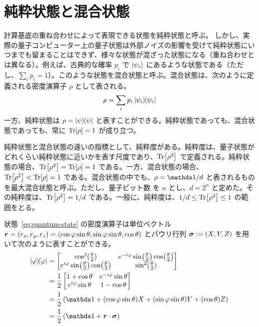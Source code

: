 \section{純粋状態と混合状態}\label{sec:pure-mixed-state}
計算基底の重ね合わせによって表現できる状態を純粋状態と呼ぶ。
しかし、実際の量子コンピューター上の量子状態は外部ノイズの影響を受けて純粋状態にいつまでも留まることはできず、様々な状態が混ざった状態になる（重ね合わせとは異なる）。例えば、古典的な確率 $p_i$ で $\ket{\psi_i}$ にあるような状態である（ただし、$\sum_i p_i = 1$）。このような状態を混合状態と呼ぶ。混合状態は、次のように定義される密度演算子 $\rho$ として表される。
\begin{align}
    \rho = \sum_i p_i\dyad{\psi_i}
\end{align}
一方、純粋状態は $\rho = \dyad{\psi}$ と表すことができる。純粋状態であっても、混合状態であっても、常に $\Tr[\rho] = 1$ が成り立つ。

純粋状態と混合状態の違いの指標として、純粋度がある。純粋度は、量子状態がどれくらい純粋状態に近いかを表す尺度であり、$\Tr[\rho^2]$ で定義される。純粋状態の場合、$\Tr[\rho^2] = \Tr[\rho] = 1$ である。一方、混合状態の場合、$\Tr[\rho^2] < \Tr[\rho] = 1$ である。混合状態の中でも、$\rho = \bbid/d$ と表されるものを最大混合状態と呼ぶ。ただし、量子ビット数 を $n$ とし、$d = 2^n$ と定めた。その純粋度は、$\Tr[\rho^2] = 1/d$ である。一般に、純粋度は、$1/d \leq \Tr[\rho^2] \leq 1$ の範囲をとる。

状態~\eqref{eq:quantum-state} の密度演算子は単位ベクトル $\boldsymbol{r} = (r_x, r_y, r_z) = (\cos{\varphi}\sin{\theta}, \sin{\varphi}\sin{\theta}, \cos{\theta})$ とパウリ行列 $\boldsymbol{\sigma} := (X,Y,Z)$ を用いて次のように表すことができる。
\begin{align}\label{eq:density-operator-1qubit}
    \dyad{\varphi}
    &= \mqty[\cos^2(\frac{\th}{2}) & e^{-i\varphi}\sin(\frac{\th}{2})\cos(\frac{\th}{2}) \\ e^{i\varphi}\sin(\frac{\th}{2})\cos(\frac{\th}{2}) & \sin^2(\frac{\th}{2})] \nonumber\\
    &= \frac12\,\mqty[1+\cos{\th} & e^{-i\varphi}\sin{\th} \\ e^{i\varphi}\sin{\th} & 1-\cos{\th}] \nonumber\\
    &= \frac12\,(\bbid + (\cos{\varphi}\sin{\th})X + (\sin{\varphi}\sin{\th})Y + (\cos{\th})Z) \nonumber\\
    &= \frac12\,(\bbid + \bs{r}\cdot\bs{\sigma})
\end{align}


